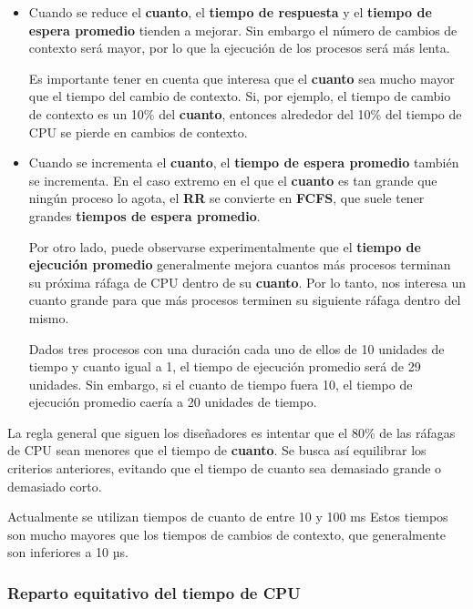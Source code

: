 \begin{itemize}
\item
  Cuando se reduce el \textbf{cuanto}, el \textbf{tiempo de respuesta} y
  el \textbf{tiempo de espera promedio} tienden a mejorar. Sin embargo
  el número de cambios de contexto será mayor, por lo que la ejecución
  de los procesos será más lenta.

  Es importante tener en cuenta que interesa que el \textbf{cuanto} sea
  mucho mayor que el tiempo del cambio de contexto. Si, por ejemplo, el
  tiempo de cambio de contexto es un 10\% del \textbf{cuanto}, entonces
  alrededor del 10\% del tiempo de CPU se pierde en cambios de contexto.
\item
  Cuando se incrementa el \textbf{cuanto}, el \textbf{tiempo de espera
  promedio} también se incrementa. En el caso extremo en el que el
  \textbf{cuanto} es tan grande que ningún proceso lo agota, el
  \textbf{RR} se convierte en \textbf{FCFS}, que suele tener grandes
  \textbf{tiempos de espera promedio}.

  Por otro lado, puede observarse experimentalmente que el
  \textbf{tiempo de ejecución promedio} generalmente mejora cuantos más
  procesos terminan su próxima ráfaga de CPU dentro de su
  \textbf{cuanto}. Por lo tanto, nos interesa un cuanto grande para que
  más procesos terminen su siguiente ráfaga dentro del mismo.

  Dados tres procesos con una duración cada uno de ellos de 10 unidades
  de tiempo y cuanto igual a 1, el tiempo de ejecución promedio será de
  29 unidades. Sin embargo, si el cuanto de tiempo fuera 10, el tiempo
  de ejecución promedio caería a 20 unidades de tiempo.
\end{itemize}

La regla general que siguen los diseñadores es intentar que el 80\% de
las ráfagas de CPU sean menores que el tiempo de \textbf{cuanto}. Se
busca así equilibrar los criterios anteriores, evitando que el tiempo de
cuanto sea demasiado grande o demasiado corto.

Actualmente se utilizan tiempos de cuanto de entre 10 y 100 ms Estos
tiempos son mucho mayores que los tiempos de cambios de contexto, que
generalmente son inferiores a 10 µs.

\subsubsection{Reparto equitativo del tiempo de
CPU}\label{_reparto_equitativo_del_tiempo_de_cpu}

